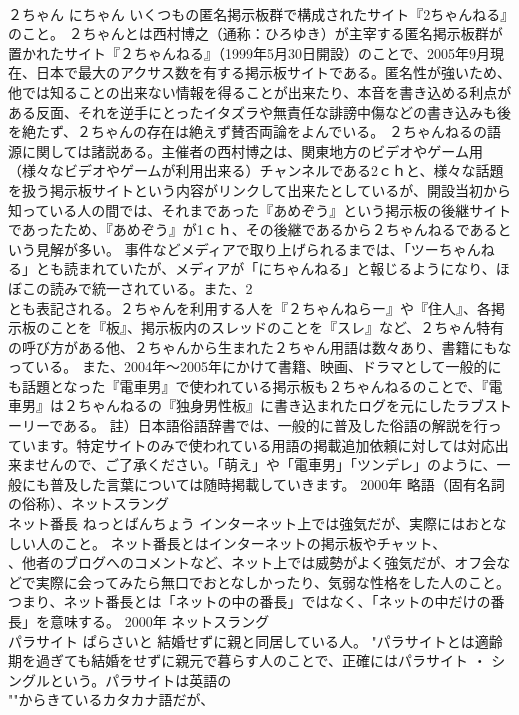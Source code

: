 \documentclass[8pt]{extreport}
\begin{document}
\begin{CJK}{UTF8}{min}
\\	２ちゃん	にちゃん	いくつもの匿名掲示板群で構成されたサイト『2ちゃんねる』のこと。	２ちゃんとは西村博之（通称：ひろゆき）が主宰する匿名掲示板群が置かれたサイト『２ちゃんねる』（1999年5月30日開設）のことで、2005年9月現在、日本で最大のアクサス数を有する掲示板サイトである。匿名性が強いため、他では知ることの出来ない情報を得ることが出来たり、本音を書き込める利点がある反面、それを逆手にとったイタズラや無責任な誹謗中傷などの書き込みも後を絶たず、２ちゃんの存在は絶えず賛否両論をよんでいる。 ２ちゃんねるの語源に関しては諸説ある。主催者の西村博之は、関東地方のビデオやゲーム用（様々なビデオやゲームが利用出来る）チャンネルである2ｃｈと、様々な話題を扱う掲示板サイトという内容がリンクして出来たとしているが、開設当初から知っている人の間では、それまであった『あめぞう』という掲示板の後継サイトであったため、『あめぞう』が1ｃｈ、その後継であるから２ちゃんねるであるという見解が多い。 事件などメディアで取り上げられるまでは、「ツーちゃんねる」とも読まれていたが、メディアが「にちゃんねる」と報じるようになり、ほぼこの読みで統一されている。また、2
\\	とも表記される。２ちゃんを利用する人を『２ちゃんねらー』や『住人』、各掲示板のことを『板』、掲示板内のスレッドのことを『スレ』など、２ちゃん特有の呼び方がある他、２ちゃんから生まれた２ちゃん用語は数々あり、書籍にもなっている。 また、2004年～2005年にかけて書籍、映画、ドラマとして一般的にも話題となった『電車男』で使われている掲示板も２ちゃんねるのことで、『電車男』は２ちゃんねるの『独身男性板』に書き込まれたログを元にしたラブストーリーである。 註）日本語俗語辞書では、一般的に普及した俗語の解説を行っています。特定サイトのみで使われている用語の掲載追加依頼に対しては対応出来ませんので、ご了承ください。「萌え」や「電車男」「ツンデレ」のように、一般にも普及した言葉については随時掲載していきます。	2000年	略語（固有名詞の俗称）、ネットスラング	
\\	ネット番長	ねっとばんちょう	インターネット上では強気だが、実際にはおとなしい人のこと。	ネット番長とはインターネットの掲示板やチャット、
\\	、他者のブログへのコメントなど、ネット上では威勢がよく強気だが、オフ会などで実際に会ってみたら無口でおとなしかったり、気弱な性格をした人のこと。つまり、ネット番長とは「ネットの中の番長」ではなく、「ネットの中だけの番長」を意味する。	2000年	ネットスラング	
\\	パラサイト	ぱらさいと	結婚せずに親と同居している人。	"パラサイトとは適齢期を過ぎても結婚をせずに親元で暮らす人のことで、正確にはパラサイト ・ シングルという。パラサイトは英語の
\\	""からきているカタカナ語だが、

\end{CJK}
\end{document}

